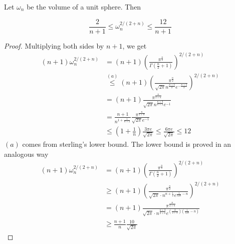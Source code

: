 \begin{lem} \label{vol-sphere-bound}
Let $\omega_n$ be the volume of a unit sphere. Then

$$ \frac{2}{n+1} \leq \omega_{n}^{2/(2+n)}\leq \frac{12}{n+1}$$
\end{lem}
\begin{proof} Multiplying both sides by $n+1$, we get
\begin{align*}
(n+1)\omega_{n}^{2/(2+n)} & =(n+1)\left(\frac{\pi^{\frac{n}{2}}}{\Gamma(\frac{n}{2}+1)}\right)^{2/(2+n)}\\
 & \overset{(a)}{\leq}(n+1)\left(\frac{\pi^{\frac{n}{2}}}{\sqrt{2\pi}n^{\frac{n+3}{2}}e^{-\frac{n+2}{2}}}\right)^{2/(2+n)}\\
 & =(n+1)\frac{\pi^{\frac{n}{2+n}}}{\sqrt{2\pi}n^{\frac{n+3}{n+2}}e^{-1}}\\
 & =\frac{n+1}{n^{1+\frac{1}{n+2}}}\frac{\pi^{\frac{n}{2+n}}}{\sqrt{2\pi}e^{-1}}\\
 & \leq\left(1+\frac{1}{n}\right)\frac{3\pi e}{\sqrt{2\pi}}
  \leq\frac{6\pi e}{\sqrt{2\pi}} \leq 12
\end{align*}
$(a)$ comes from sterling's lower bound. The lower bound is proved in an analogous way
\begin{align*}
(n+1)\omega_{n}^{2/(2+n)} & =(n+1)\left(\frac{\pi^{\frac{n}{2}}}{\Gamma(\frac{n}{2}+1)}\right)^{2/(2+n)}\\
 & \geq(n+1)\left(\frac{\pi^{\frac{n}{2}}}{\sqrt{2\pi}\cdot n^{n+\frac{1}{2}}e^{\frac{1}{12n}-n}}\right)^{2/(2+n)}\\
 & =(n+1)\frac{\pi^{\frac{n}{2+n}}}{\sqrt{2\pi}\cdot n^{\frac{n+3}{2+n}}e^{\left(\frac{2}{2+n}\right)\left(\frac{1}{12n}-n\right)}}\\
 & \geq\frac{n+1}{n}\frac{10}{\sqrt{2\pi}}
\end{align*}
\end{proof}
